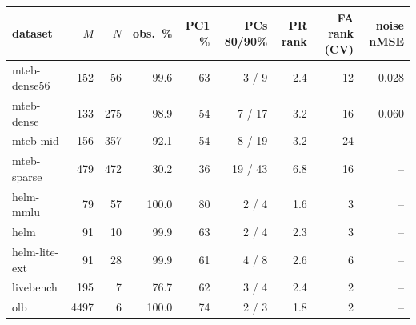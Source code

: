 \begin{tabular}{lrrrrrrrr}
\toprule
dataset & $M$ & $N$ & obs.\ \% & PC1 \% & PCs 80/90\% & PR rank & FA rank (CV) & noise nMSE \\
\midrule
mteb-dense56 & 152 & 56 & 99.6 & 63 & 3 / 9 & 2.4 & 12 & 0.028 \\
mteb-dense & 133 & 275 & 98.9 & 54 & 7 / 17 & 3.2 & 16 & 0.060 \\
mteb-mid & 156 & 357 & 92.1 & 54 & 8 / 19 & 3.2 & 24 & -- \\
mteb-sparse & 479 & 472 & 30.2 & 36 & 19 / 43 & 6.8 & 16 & -- \\
helm-mmlu & 79 & 57 & 100.0 & 80 & 2 / 4 & 1.6 & 3 & -- \\
helm & 91 & 10 & 99.9 & 63 & 2 / 4 & 2.3 & 3 & -- \\
helm-lite-ext & 91 & 28 & 99.9 & 61 & 4 / 8 & 2.6 & 6 & -- \\
livebench & 195 & 7 & 76.7 & 62 & 3 / 4 & 2.4 & 2 & -- \\
olb & 4497 & 6 & 100.0 & 74 & 2 / 3 & 1.8 & 2 & -- \\
\bottomrule
\end{tabular}
